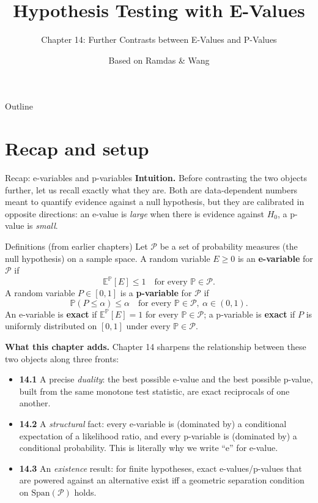 \documentclass[aspectratio=169,10pt]{beamer}
\title[E-Values -- Ch.14]{Hypothesis Testing with E-Values}
\subtitle{Chapter 14: Further Contrasts between E-Values and P-Values}
\author{Based on Ramdas \& Wang}
\date{}
\newcommand{\PP}{\mathbb{P}}
\newcommand{\EE}{\mathbb{E}}
\newcommand{\calP}{\mathcal{P}}
\newcommand{\Span}{\mathrm{Span}}
\begin{document}
\begin{frame}
  \titlepage
\end{frame}

\begin{frame}{Outline}
  \tableofcontents
\end{frame}

\section{Recap and setup}

\begin{frame}[allowframebreaks]{Recap: e-variables and p-variables}
  \textbf{Intuition.} Before contrasting the two objects further, let us
  recall exactly what they are. Both are data-dependent numbers meant to
  quantify evidence against a null hypothesis, but they are calibrated in
  opposite directions: an e-value is \emph{large} when there is evidence
  against $H_0$, a p-value is \emph{small}.

  \begin{block}{Definitions (from earlier chapters)}
    Let $\calP$ be a set of probability measures (the null hypothesis) on
    a sample space. A random variable $E \geq 0$ is an \textbf{e-variable}
    for $\calP$ if
    \[
      \EE^{\PP}[E] \leq 1 \quad \text{for every } \PP \in \calP .
    \]
    A random variable $P \in [0,1]$ is a \textbf{p-variable} for $\calP$ if
    \[
      \PP(P \leq \alpha) \leq \alpha \quad \text{for every } \PP \in \calP,\ \alpha \in (0,1).
    \]
    An e-variable is \textbf{exact} if $\EE^{\PP}[E] = 1$ for every $\PP\in\calP$;
    a p-variable is \textbf{exact} if $P$ is uniformly distributed on $[0,1]$
    under every $\PP \in \calP$.
  \end{block}

  \textbf{What this chapter adds.} Chapter 14 sharpens the relationship
  between these two objects along three fronts:
  \begin{itemize}
    \item \textbf{14.1} A precise \emph{duality}: the best possible e-value
      and the best possible p-value, built from the same monotone
      test statistic, are exact reciprocals of one another.
    \item \textbf{14.2} A \emph{structural} fact: every e-variable is
      (dominated by) a conditional expectation of a likelihood ratio, and
      every p-variable is (dominated by) a conditional probability. This is
      literally why we write ``e'' for e-value.
    \item \textbf{14.3} An \emph{existence} result: for finite hypotheses,
      exact e-values/p-values that are powered against an alternative exist
      iff a geometric separation condition on $\Span(\calP)$ holds.
  \end{itemize}
\end{frame}
\end{document}
